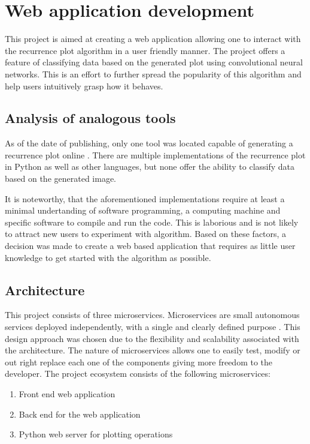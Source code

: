\documentclass[a4paper,12pt,fleqn]{article}
\begin{document}


\newpage


\section{Web application development}
This project is aimed at creating a web application allowing one to interact with the recurrence plot algorithm in a user friendly manner.
The project offers a feature of classifying data based on the generated plot using convolutional neural networks.
This is an effort to further spread the popularity of this algorithm and help users intuitively grasp how it behaves.


\subsection{Analysis of analogous tools}
As of the date of publishing, only one tool was located capable
of generating a recurrence plot online \cite{recurrence_plot_tk}.
There are multiple implementations of the recurrence plot in Python as well as other
languages, but none offer the ability to classify data based on the generated image.

It is noteworthy, that the aforementioned implementations require at least a minimal undertanding of software programming, a computing machine and specific software to compile and run the code.
This is laborious and is not likely to attract new users to experiment with algorithm.
Based on these factors, a decision was made to create a web based application that requires
as little user knowledge to get started with the algorithm as possible.


\subsection{Architecture}
This project consists of three microservices.
Microservices are small autonomous services deployed independently, with a single and clearly defined purpose \cite{krause2015microservices}. This design approach was chosen due to the flexibility and scalability associated with the architecture. %
The nature of microservices allows one to easily test, modify or out right replace each one of the components giving more freedom to the developer.
The project ecosystem consists of the following microservices:
\begin{enumerate}
  \item Front end web application
  \item Back end for the web application
  \item Python web server for plotting operations
\end{enumerate}
\end{document}

